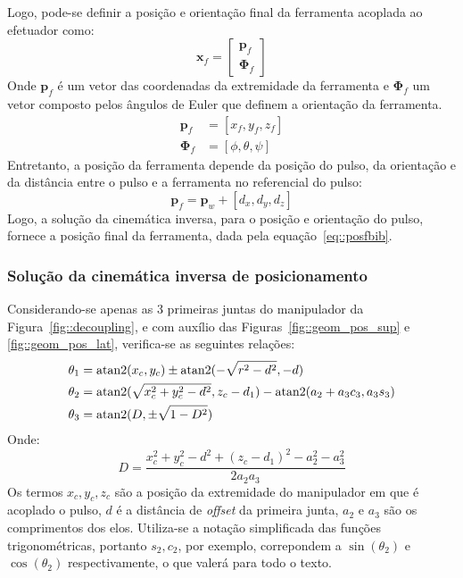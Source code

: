 Logo, pode-se definir a posição e orientação final da ferramenta acoplada ao
efetuador como:
%
\begin{equation}
	\mathbf{x}_{f} = \begin{bmatrix}
		\mathbf{p}_{f} \\ \boldsymbol{\Phi}_{f}
	\end{bmatrix}
	\label{eq::posf}	
\end{equation}
%
Onde $\mathbf{p}_{f}$ é um vetor das coordenadas da extremidade da ferramenta e
$\boldsymbol{\Phi}_{f}$ um vetor composto pelos ângulos de Euler que definem a
orientação da ferramenta.
%
\begin{align}
\mathbf{p}_{f} &= [x_f,y_f,z_f] \\
\boldsymbol{\Phi}_{f} &= [\phi,\theta,\psi]
\end{align}
%
Entretanto, a posição da ferramenta depende da posição do pulso, da orientação
e da distância entre o pulso e a ferramenta no referencial do pulso:
% 
\begin{equation} \label{eq::posfbib}
	\mathbf{p}_{f} = \mathbf{p}_{w} + [d_{x}, d_{y}, d_{z}]
\end{equation}
%
Logo, a solução da cinemática inversa, para o posição e orientação do pulso,
fornece a posição final da ferramenta, dada pela equação~\ref{eq::posfbib}.


\subsubsection{Solução da cinemática inversa de posicionamento}

Considerando-se apenas as 3 primeiras juntas do manipulador da
Figura~\ref{fig::decoupling}, e com auxílio das Figuras~\ref{fig::geom_pos_sup}
e \ref{fig::geom_pos_lat}, verifica-se as seguintes relações:
%
\begin{align}
	\theta_{1} &= \operatorname{atan2}(x_c, y_c) \pm \operatorname{atan2}(-\sqrt{r^2-d^2}, -d)
	\label{eq::theta1}\\
	\theta_{2} &= \operatorname{atan2}(\sqrt{x_c^2+y_c^2-d^2}, z_c-d_1) - \operatorname{atan2}(a_2+a_3
	c_3,a_3 s_3) \label{eq::theta2} \\
	\theta_{3} &= \operatorname{atan2}(D, \pm \sqrt{1-D^2}) \label{eq::theta3}
\end{align}
%
Onde:
\begin{equation*}
		D = \frac{x_c^2+y_c^2-d^2 + (z_c-d_1)^2 - a_2^2 - a_3^2}{2a_2 a_3}
\end{equation*}
%
Os termos $x_c, y_c, z_c$ são a posição da extremidade do manipulador em que
é acoplado o pulso, $d$ é a distância de \textit{offset} da primeira junta,
$a_2$ e $a_3$ são os comprimentos dos elos. Utiliza-se a notação simplificada
das funções trigonométricas, portanto $s_2, c_2$, por exemplo, correpondem a
$\sin(\theta_2)$ e $\cos(\theta_2)$ respectivamente, o que valerá para todo o
texto.


